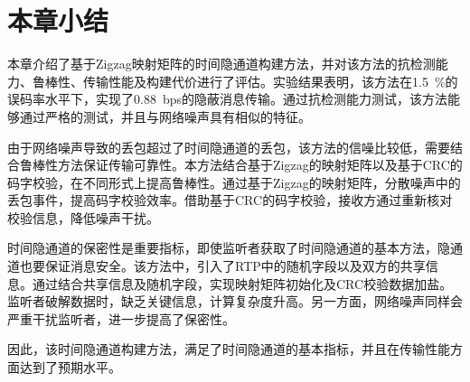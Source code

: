 \section{本章小结}
\label{chap:zigzag:summary}

本章介绍了基于Zigzag映射矩阵的时间隐通道构建方法，并对该方法的抗检测能力、鲁棒性、传输性能及构建代价进行了评估。实验结果表明，该方法在{1.5\ \%}的误码率水平下，实现了{0.88\ bps}的隐蔽消息传输。通过抗检测能力测试，该方法能够通过严格的测试，并且与网络噪声具有相似的特征。

由于网络噪声导致的丢包超过了时间隐通道的丢包，该方法的信噪比较低，需要结合鲁棒性方法保证传输可靠性。本方法结合基于Zigzag的映射矩阵以及基于CRC的码字校验，在不同形式上提高鲁棒性。通过基于Zigzag的映射矩阵，分散噪声中的丢包事件，提高码字校验效率。借助基于CRC的码字校验，接收方通过重新核对校验信息，降低噪声干扰。

时间隐通道的保密性是重要指标，即使监听者获取了时间隐通道的基本方法，隐通道也要保证消息安全。该方法中，引入了RTP中的随机字段以及双方的共享信息。通过结合共享信息及随机字段，实现映射矩阵初始化及CRC校验数据加盐。监听者破解数据时，缺乏关键信息，计算复杂度升高。另一方面，网络噪声同样会严重干扰监听者，进一步提高了保密性。

因此，该时间隐通道构建方法，满足了时间隐通道的基本指标，并且在传输性能方面达到了预期水平。